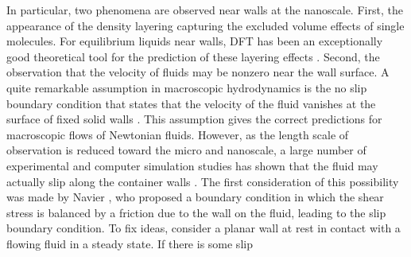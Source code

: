 \documentclass[b5paper,openright,10pt]{book}
\newcommand{\Note}[1]{{\bf \color{red}#1}}    %
\begin{document}
In  particular,  two phenomena  are
observed near  walls at the  nanoscale.  First, the appearance  of the
density  layering  capturing the  excluded  volume  effects of  single
molecules.   For equilibrium  liquids near  walls, 
DFT has  been an exceptionally good theoretical  tool for the
prediction of  these layering effects \cite{Hansen2013}.   Second, the
observation that the velocity of fluids  may be nonzero near the wall
surface.
A quite remarkable  assumption in macroscopic hydrodynamics  is the no
slip boundary  condition that  states that the  velocity of  the fluid
vanishes  at the  surface of  fixed solid  walls \cite{Batcherlor1967}.
This assumption gives the correct predictions for macroscopic flows of
Newtonian  fluids.  However,  as the  length scale  of observation  is
reduced  toward   the  micro  and   nanoscale,  a  large   number  of
experimental   \cite{Lauga2005}   and  computer   simulation   studies
\cite{Koplik1995} has shown that the fluid may actually slip along the
container walls  \cite{KarniadakisBook2005}.  The  first consideration
of this possibility was made  by Navier \cite{Navier1827}, who proposed
a  boundary condition  in  which the  shear stress  is  balanced by  a
friction due  to the wall on  the fluid, leading to  the slip boundary
condition.  To  fix ideas, consider a  planar wall at rest  in contact
with  a flowing  fluid  in a  steady  state.  If  there  is some  slip
\end{document}
